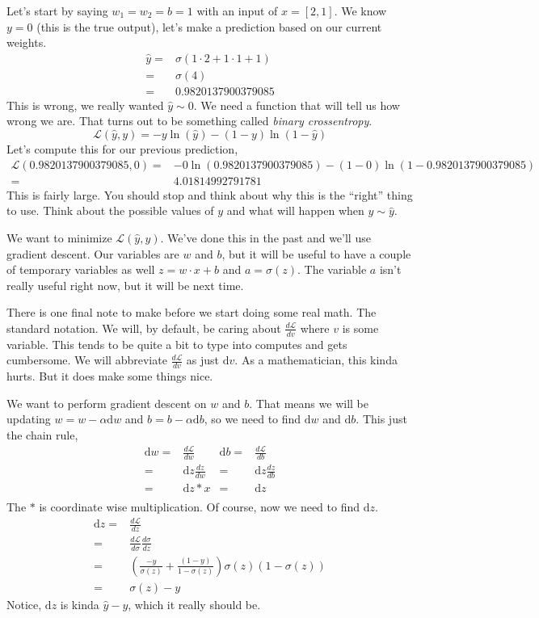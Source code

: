 \documentclass[11pt,letterpaper]{article}
\newcommand{\D}{\text{d}}
\begin{document}
Let's start by saying $w_1 = w_2 = b = 1$ with an input of $x=[2,1]$. We know $y=0$ (this is the true output), let's make a prediction based on our current weights. 
\begin{align*}
 \hat{y} = & \sigma(1\cdot 2 + 1\cdot 1 + 1) \\
         = & \sigma(4) \\
         = & 0.9820137900379085
\end{align*}
This is wrong, we really wanted $\hat{y}\sim 0$. We need a function that will tell us how wrong we are. That turns out to be something called \emph{binary crossentropy}. 
\begin{equation}
 \label{eqn:binary_crossentropy}
 \mathcal{L}(\hat{y},y) = -y\ln(\hat{y}) - (1-y)\ln(1-\hat{y})
\end{equation}
Let's compute this for our previous prediction,
\begin{align*}
\mathcal{L}(0.9820137900379085,0) = & -0\ln(0.9820137900379085) - (1-0)\ln(1-0.9820137900379085)\\
 = & 4.01814992791781
\end{align*}
This is fairly large. You should stop and think about why this is the ``right'' thing to use. Think about the possible values of $y$ and what will happen when $y\sim \hat{y}$. 

We want to minimize $\mathcal{L}(\hat{y},y)$. We've done this in the past and we'll use gradient descent. Our variables are $w$ and $b$, but it will be useful to have a couple of temporary variables as well $z = w\cdot x + b$ and $a = \sigma(z)$. The variable $a$ isn't really useful right now, but it will be next time. 


There is one final note to make before we start doing some real math. The standard notation. We will, by default, be caring about $\frac{d\mathcal{L}}{dv}$ where $v$ is some variable. This tends to be quite a bit to type into computes and gets cumbersome. We will abbreviate $\frac{d\mathcal{L}}{dv}$ as just $\D v$. As a mathematician, this kinda hurts. But it does make some things nice. 

We want to perform gradient descent on $w$ and $b$. That means we will be updating $w=w-\alpha \D{w}$ and $b = b - \alpha \D b$, so we need to find $\D w$ and $\D b$. This just the chain rule,
\begin{align*}
 \D w = & \frac{d\mathcal{L}}{dw} & \D b = &  \frac{d\mathcal{L}}{db} \\
 = & \D z\frac{dz}{dw} &  = & \D z\frac{dz}{db} \\
 = & \D z * x &  = & \D z \\
\end{align*}
The $*$ is coordinate wise multiplication. Of course, now we need to find $\D z$. 
\begin{align*}
 \D z = & \frac{d\mathcal{L}}{dz} \\
     = & \frac{d\mathcal{L}}{d\sigma} \frac{d\sigma}{dz}\\
     = & \left(\frac{-y}{\sigma(z)} + \frac{(1-y)}{1-\sigma(z)}\right)\sigma(z)(1-\sigma(z)) \\
     = & \sigma(z) - y
\end{align*}
Notice, $\D z$ is kinda $\hat{y}-y$, which it really should be. 
\end{document}
